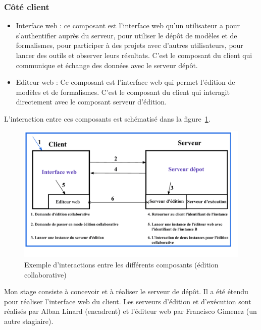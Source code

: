 \documentclass{report}
\begin{document}
\subsubsection{Côté client}

\begin{itemize}
\item Interface web : ce composant est l'interface web qu'un utilisateur a pour s'authentifier auprès du serveur, pour utiliser le dépôt de modèles et de formalismes, pour participer à des projets avec d'autres utilisateurs, pour lancer des outils et observer leurs résultats. C'est le composant du client qui communique et échange des données avec le serveur dépôt.
\item Editeur web : Ce composant est l'interface web qui permet l'édition de modèles et de formalismes. C'est le composant du client qui interagit directement avec le composant serveur d'édition.
\end{itemize}

L'interaction entre ces composants est schématisé dans la
figure~\ref{fig:interaction}.
\begin{figure}[h!]
    \centering
    \includegraphics[scale=0.60]{img/cosyverif_composants.pdf}
    \caption{Exemple d'interactions entre les différents composants (édition collaborative)}
    \label{fig:interaction}
\end{figure}

\medskip

Mon stage consiste à concevoir et à réaliser le serveur de dépôt. Il a été
étendu pour réaliser l'interface web du client. Les serveurs d'édition et
d'exécution sont réalisés par Alban Linard (encadrent) et l'éditeur web par
Francisco Gimenez (un autre stagiaire).
\end{document}
